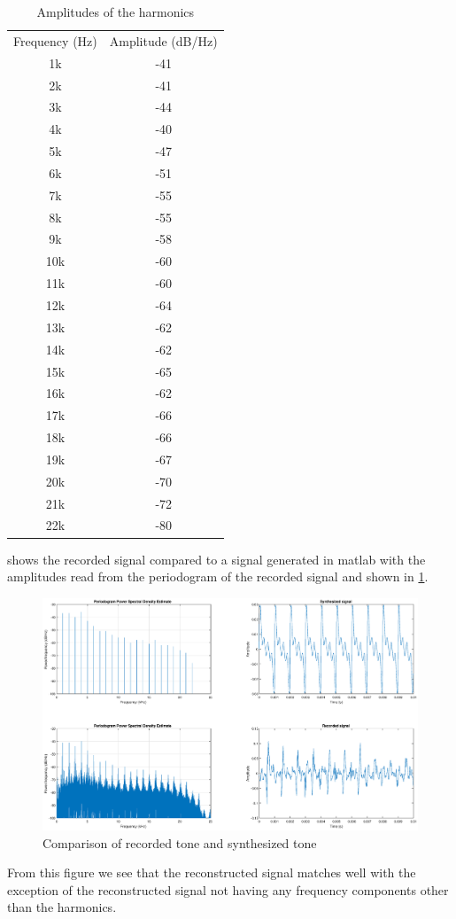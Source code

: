 \begin{table}[h]
    \centering
    \begin{tabular}{c|c}
        Frequency (Hz) & Amplitude (dB/Hz) \\
        1k  & -41 \\
        2k  & -41 \\
        3k  & -44 \\
        4k  & -40 \\
        5k  & -47 \\
        6k  & -51 \\
        7k  & -55 \\
        8k  & -55 \\
        9k  & -58 \\
        10k & -60 \\
        11k & -60 \\
        12k & -64 \\
        13k & -62 \\
        14k & -62 \\
        15k & -65 \\
        16k & -62 \\
        17k & -66 \\
        18k & -66 \\
        19k & -67 \\
        20k & -70 \\
        21k & -72 \\
        22k & -80
    \end{tabular}
    \caption{Amplitudes of the harmonics}
    \label{tab:1k_amps}
\end{table}

 shows the recorded signal compared to a signal generated in matlab with the amplitudes read from the periodogram of the recorded signal and shown in \cref{tab:1k_amps}.

\begin{figure}[H]
    \centering
    \includegraphics[trim={4cm 1.6cm 4cm 1.6cm},clip,width=\textwidth]{img/tones.eps}
    \caption{Comparison of recorded tone and synthesized tone}
    \label{fig:rectones}
\end{figure}

From this figure we see that the reconstructed signal matches well with the exception of the reconstructed signal not having any frequency components other than the harmonics.